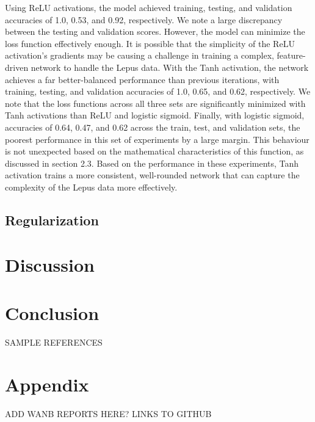 \documentclass{article}
\begin{document}
Using ReLU activations, the model achieved training, testing, and validation accuracies of 1.0, 0.53, and 0.92, respectively. We note a large discrepancy between the testing and validation scores. However, the model can minimize the loss function effectively enough. It is possible that the simplicity of the ReLU activation’s gradients may be causing a challenge in training a complex, feature-driven network to handle the Lepus data. With the Tanh activation, the network achieves a far better-balanced performance than previous iterations, with training, testing, and validation accuracies of 1.0, 0.65, and 0.62, respectively. We note that the loss functions across all three sets are significantly minimized with Tanh activations than ReLU and logistic sigmoid. Finally, with logistic sigmoid, accuracies of 0.64, 0.47, and 0.62 across the train, test, and validation sets, the poorest performance in this set of experiments by a large margin. This behaviour is not unexpected based on the mathematical characteristics of this function, as discussed in section 2.3. Based on the performance in these experiments, Tanh activation trains a more consistent, well-rounded network that can capture the complexity of the Lepus data more effectively.


\subsection{Regularization}
\section{Discussion}
\section{Conclusion}







\medskip


SAMPLE REFERENCES


\appendix

\section{Appendix}

ADD WANB REPORTS HERE? LINKS TO GITHUB
\end{document}

